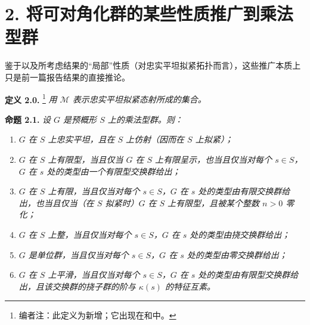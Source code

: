 
\setcounter{footnote}{2}

\section*{2. 将可对角化群的某些性质推广到乘法型群}

鉴于以及所考虑结果的“局部”性质（对忠实平坦拟紧拓扑而言），这些推广本质上只是前一篇报告结果的直接推论。

\medskip
\noindent{}\textbf{定义 2.0.}
\footnote{编者注：此定义为新增；它出现在和中。}
\textit{用 \(\mathcal M\) 表示忠实平坦拟紧态射所成的集合。}

\medskip
\noindent{}\textbf{命题 2.1.}
\textit{设 \(G\) 是预概形 \(S\) 上的乘法型群。则：}
\begin{enumerate}
  \item[(a)]
  \textit{\(G\) 在 \(S\) 上忠实平坦，且在 \(S\) 上仿射（因而在 \(S\) 上拟紧）；}

  \item[(b)]
  \textit{\(G\) 在 \(S\) 上有限型，当且仅当 \(G\) 在 \(S\) 上有限呈示，也当且仅当对每个 \(s\in S\)，\(G\) 在 \(s\) 处的类型由一个有限型交换群给出；}

  \item[(c)]
  \textit{\(G\) 在 \(S\) 上有限，当且仅当对每个 \(s\in S\)，\(G\) 在 \(s\) 处的类型由有限交换群给出，也当且仅当（在 \(S\) 拟紧时）\(G\) 在 \(S\) 上有限型，且被某个整数 \(n>0\) 零化；}

  \item[\((c')\)]
  \textit{\(G\) 在 \(S\) 上整，当且仅当对每个 \(s\in S\)，\(G\) 在 \(s\) 处的类型由挠交换群给出；}

  \item[(d)]
  \textit{\(G\) 是单位群，当且仅当对每个 \(s\in S\)，\(G\) 在 \(s\) 处的类型由零交换群给出；}

  \item[(e)]
  \textit{\(G\) 在 \(S\) 上平滑，当且仅当对每个 \(s\in S\)，\(G\) 在 \(s\) 处的类型由有限型交换群给出，且该交换群的挠子群的阶与 \(\kappa(s)\) 的特征互素。}
\end{enumerate}

